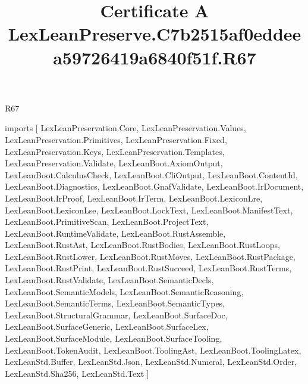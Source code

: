\begin{lexlean}{R67}
\title{Certificate A LexLeanPreserve.C7b2515af0eddeea59726419a6840f51f.R67}
\begin{coremodule}
imports [
  LexLeanPreservation.Core,
  LexLeanPreservation.Values,
  LexLeanPreservation.Primitives,
  LexLeanPreservation.Fixed,
  LexLeanPreservation.Keys,
  LexLeanPreservation.Templates,
  LexLeanPreservation.Validate,
  LexLeanBoot.AxiomOutput,
  LexLeanBoot.CalculusCheck,
  LexLeanBoot.CliOutput,
  LexLeanBoot.ContentId,
  LexLeanBoot.Diagnostics,
  LexLeanBoot.GnafValidate,
  LexLeanBoot.IrDocument,
  LexLeanBoot.IrProof,
  LexLeanBoot.IrTerm,
  LexLeanBoot.LexiconLre,
  LexLeanBoot.LexiconLse,
  LexLeanBoot.LockText,
  LexLeanBoot.ManifestText,
  LexLeanBoot.PrimitiveScan,
  LexLeanBoot.ProjectText,
  LexLeanBoot.RuntimeValidate,
  LexLeanBoot.RustAssemble,
  LexLeanBoot.RustAst,
  LexLeanBoot.RustBodies,
  LexLeanBoot.RustLoops,
  LexLeanBoot.RustLower,
  LexLeanBoot.RustMoves,
  LexLeanBoot.RustPackage,
  LexLeanBoot.RustPrint,
  LexLeanBoot.RustSucceed,
  LexLeanBoot.RustTerms,
  LexLeanBoot.RustValidate,
  LexLeanBoot.SemanticDecls,
  LexLeanBoot.SemanticModels,
  LexLeanBoot.SemanticReasoning,
  LexLeanBoot.SemanticTerms,
  LexLeanBoot.SemanticTypes,
  LexLeanBoot.StructuralGrammar,
  LexLeanBoot.SurfaceDoc,
  LexLeanBoot.SurfaceGeneric,
  LexLeanBoot.SurfaceLex,
  LexLeanBoot.SurfaceModule,
  LexLeanBoot.SurfaceTooling,
  LexLeanBoot.TokenAudit,
  LexLeanBoot.ToolingAst,
  LexLeanBoot.ToolingLatex,
  LexLeanStd.Buffer,
  LexLeanStd.Json,
  LexLeanStd.Numeral,
  LexLeanStd.Order,
  LexLeanStd.Sha256,
  LexLeanStd.Text
]


\end{coremodule}
\end{lexlean}
